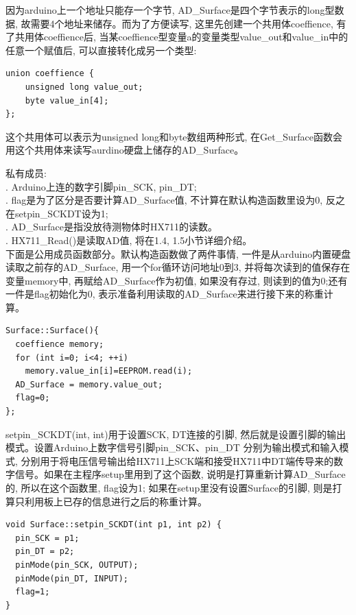 \documentclass{article}
\begin{document}
因为arduino上一个地址只能存一个字节, AD\_Surface是四个字节表示的long型数据, 故需要4个地址来储存。而为了方便读写, 这里先创建一个共用体coeffience,
有了共用体coeffience后, 当某coeffience型变量a的变量类型value\_out和value\_in中的任意一个赋值后, 可以直接转化成另一个类型:
\begin{lstlisting}
union coeffience {
    unsigned long value_out;
    byte value_in[4];
};
\end{lstlisting}

这个共用体可以表示为unsigned long和byte数组两种形式, 在Get\_Surface函数会用这个共用体来读写aurdino硬盘上储存的AD\_Surface。

私有成员: \\
.	Arduino上连的数字引脚pin\_SCK, pin\_DT;\\
. flag是为了区分是否要计算AD\_Surface值, 不计算在默认构造函数里设为0, 反之在setpin\_SCKDT设为1;\\
. AD\_Surface是指没放待测物体时HX711的读数。\\
. HX711\_Read()是读取AD值, 将在1.4, 1.5小节详细介绍。\\

下面是公用成员函数部分。默认构造函数做了两件事情, 一件是从arduino内置硬盘读取之前存的AD\_Surface, 用一个for循环访问地址0到3, 并将每次读到的值保存在变量memory中, 再赋给AD\_Surface作为初值,
如果没有存过, 则读到的值为0;还有一件是flag初始化为0, 表示准备利用读取的AD\_Surface来进行接下来的称重计算。
\begin{lstlisting}
Surface::Surface(){
  coeffience memory;
  for (int i=0; i<4; ++i)
    memory.value_in[i]=EEPROM.read(i);
  AD_Surface = memory.value_out;
  flag=0;
};  
\end{lstlisting}

setpin\_SCKDT(int, int)用于设置SCK, DT连接的引脚, 然后就是设置引脚的输出模式。设置Arduino上数字信号引脚pin\_SCK、pin\_DT
分别为输出模式和输入模式, 分别用于将电压信号输出给HX711上SCK端和接受HX711中DT端传导来的数字信号。如果在主程序setup里用到了这个函数, 说明是打算重新计算AD\_Surface的, 
所以在这个函数里, flag设为1; 如果在setup里没有设置Surface的引脚, 则是打算只利用板上已存的信息进行之后的称重计算。\\
\begin{lstlisting}
void Surface::setpin_SCKDT(int p1, int p2) {
  pin_SCK = p1;
  pin_DT = p2;
  pinMode(pin_SCK, OUTPUT);	
  pinMode(pin_DT, INPUT);	
  flag=1;
}
\end{lstlisting}
\end{document}
